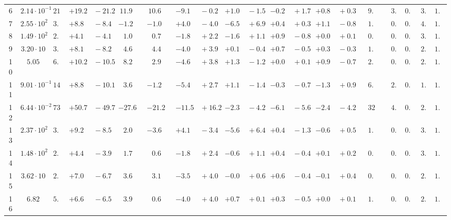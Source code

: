 \documentclass[12pt]{article}
\begin{document}
\begin{table}
\begin{tabular}{ccrr@{\hskip0pt}rrc@{\hskip0pt}r@{\hskip0pt}c@{\hskip0pt}r@{\hskip0pt}rr@{\hskip0pt}rr@{\hskip0pt}rr@{\hskip0pt}rr@{\hskip0pt}r@{\hskip0pt}r@{\hskip0pt}c|rr|r}
6 &$2.14 \cdot 10^{-1}$ &$21.6$  & ${+19.2~}$&${~-21.2}$ & $11.9$  & &$10.6$&&${-9.1~}$&${~-0.2}$ & ${+1.0~}$&${~-1.5}$ & ${-0.2~}$&${~+1.7}$ & ${+0.8~}$&${~+0.3}$ & &$ 9.4$&&$ 3.8$  & $0.97$  & $ 3.0$  & $1.04$   \\ 
7 &$2.55 \cdot 10^{2}$ &$ 3.0$  & ${+8.8~}$&${~-8.4}$ & $-1.2$  & &$-1.0$&&${+4.0~}$&${~-4.0}$ & ${-6.5~}$&${~+6.9}$ & ${+0.4~}$&${~+0.3}$ & ${+1.1~}$&${~-0.8}$ & &$ 1.6$&&$ 0.6$  & $0.87$  & $ 4.3$  & $1.01$   \\ 
8 &$1.49 \cdot 10^{2}$ &$ 2.1$  & ${+4.1~}$&${~-4.1}$ & $ 1.0$  & &$ 0.7$&&${-1.8~}$&${~+2.2}$ & ${-1.6~}$&${~+1.1}$ & ${+0.9~}$&${~-0.8}$ & ${+0.0~}$&${~+0.1}$ & &$ 0.9$&&$ 0.3$  & $0.90$  & $ 3.5$  & $1.02$   \\ 
9 &$3.20 \cdot 10$ &$ 3.0$  & ${+8.1~}$&${~-8.2}$ & $ 4.6$  & &$ 4.4$&&${-4.0~}$&${~+3.9}$ & ${+0.1~}$&${~-0.4}$ & ${+0.7~}$&${~-0.5}$ & ${+0.3~}$&${~-0.3}$ & &$ 1.0$&&$ 0.8$  & $0.94$  & $ 2.8$  & $1.02$   \\ 
10 &$5.05$ &$ 6.7$  & ${+10.2~}$&${~-10.5}$ & $ 8.2$  & &$ 2.9$&&${-4.6~}$&${~+3.8}$ & ${+1.3~}$&${~-1.2}$ & ${+0.0~}$&${~+0.1}$ & ${+0.9~}$&${~-0.7}$ & &$ 2.0$&&$ 0.9$  & $0.95$  & $ 2.0$  & $1.02$   \\ 
11 &$9.01 \cdot 10^{-1}$ &$14.5$  & ${+8.8~}$&${~-10.1}$ & $ 3.6$  & &$-1.2$&&${-5.4~}$&${~+2.7}$ & ${+1.1~}$&${~-1.4}$ & ${-0.3~}$&${~-0.7}$ & ${-1.3~}$&${~+0.9}$ & &$ 6.4$&&$ 2.5$  & $0.95$  & $ 1.7$  & $1.05$   \\ 
12 &$6.44 \cdot 10^{-2}$ &$73.1$  & ${+50.7~}$&${~-49.7}$ & $-27.6$  & &$-21.2$&&${-11.5~}$&${~+16.2}$ & ${-2.3~}$&${~-4.2}$ & ${-6.1~}$&${~-5.6}$ & ${-2.4~}$&${~-4.2}$ & &$32.1$&&$ 4.3$  & $0.96$  & $ 2.3$  & $1.05$   \\ 
13 &$2.37 \cdot 10^{2}$ &$ 3.0$  & ${+9.2~}$&${~-8.5}$ & $ 2.0$  & &$-3.6$&&${+4.1~}$&${~-3.4}$ & ${-5.6~}$&${~+6.4}$ & ${+0.4~}$&${~-1.3}$ & ${-0.6~}$&${~+0.5}$ & &$ 1.5$&&$ 0.5$  & $0.89$  & $ 3.6$  & $1.02$   \\ 
14 &$1.48 \cdot 10^{2}$ &$ 2.1$  & ${+4.4~}$&${~-3.9}$ & $ 1.7$  & &$ 0.6$&&${-1.8~}$&${~+2.4}$ & ${-0.6~}$&${~+1.1}$ & ${+0.4~}$&${~-0.4}$ & ${+0.1~}$&${~+0.2}$ & &$ 0.8$&&$ 0.5$  & $0.91$  & $ 3.2$  & $1.02$   \\ 
15 &$3.62 \cdot 10$ &$ 2.7$  & ${+7.0~}$&${~-6.7}$ & $ 3.6$  & &$ 3.1$&&${-3.5~}$&${~+4.0}$ & ${-0.0~}$&${~+0.6}$ & ${+0.6~}$&${~-0.4}$ & ${-0.1~}$&${~+0.4}$ & &$ 0.8$&&$ 0.9$  & $0.94$  & $ 2.5$  & $1.03$   \\ 
16 &$6.82$ &$ 5.2$  & ${+6.6~}$&${~-6.5}$ & $ 3.9$  & &$ 0.6$&&${-4.0~}$&${~+4.0}$ & ${+0.7~}$&${~+0.1}$ & ${+0.3~}$&${~-0.5}$ & ${+0.0~}$&${~+0.1}$ & &$ 1.4$&&$ 0.8$  & $0.96$  & $ 2.2$  & $1.05$   \\ 

\end{tabular}
\end{table}
\end{document}
